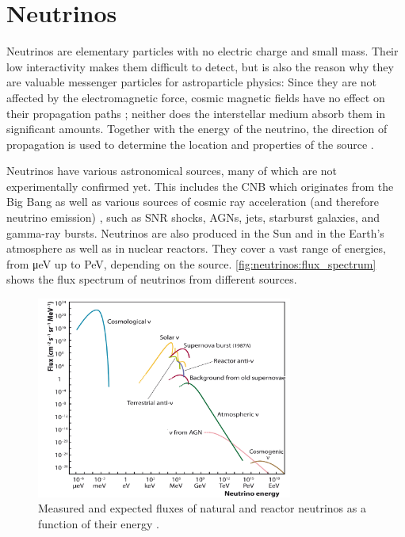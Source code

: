 \section{Neutrinos}

Neutrinos are elementary particles with no electric charge and small mass. %
Their low interactivity
  makes them difficult to detect,
  but is also the reason why they are valuable messenger particles for astroparticle physics:
Since they are not affected by the electromagnetic force,
  cosmic magnetic fields have no effect on their propagation paths \cite{neutrinos_katz};
  neither does the interstellar medium absorb them in significant amounts.
Together with the energy of the neutrino,
  the direction of propagation %
  is used to determine the location and properties of the source \cite{neutrinos_katz}.


Neutrinos have various astronomical sources,
  many of which are not experimentally confirmed yet.
This includes
  the \ac{CNB} \cite{follin2015}
     which originates from the Big Bang
  as well as various sources of cosmic ray acceleration
    (and therefore neutrino emission)
  \cite{neutrinos_aartsen_sources},
  such as
    \ac{SNR} shocks,
    \acp{AGN},
    jets,
    starburst galaxies, %
    and gamma-ray bursts.
Neutrinos are also produced in
  the Sun
  and in the Earth's atmosphere %
  as well as in nuclear reactors.
They cover a vast range of energies, from \si{\micro\electronvolt} up to \si{\peta\electronvolt},
  depending on the source. %
\autoref{fig:neutrinos:flux_spectrum} shows the flux spectrum of neutrinos from different sources.

\begin{figure}
  \centering
  \includegraphics[width=0.75\textwidth]{content/img/neutrino_spectrum.png}
  \caption{
    Measured and expected fluxes of natural and reactor neutrinos as a function of their energy \cite{spiering2012}.
  }
  \label{fig:neutrinos:flux_spectrum}
\end{figure}


